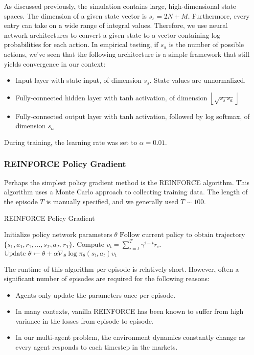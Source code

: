 \documentclass[twoside,twocolumn]{article}
\begin{document}
As discussed previously, the simulation contains large, high-dimensional state spaces. The dimension of a given state vector is $s_s = 2 N + M$. Furthermore, every entry can take on a wide range of integral values. Therefore, we use neural network architectures to convert a given state to a vector containing log probabilities for each action. In empirical testing, if $s_a$ is the number of possible actions, we've seen that the following architecture is a simple framework that still yields convergence in our context:
\begin{itemize}
  \item Input layer with state input, of dimension $s_s$. State values are unnormalized.
  \item Fully-connected hidden layer with tanh activation, of dimension $\left\lfloor \sqrt{s_s \, s_a} \right\rfloor$
  \item Fully-connected output layer with tanh activation, followed by log softmax, of dimension $s_a$
\end{itemize}
During training, the learning rate was set to $\alpha = 0.01$. 


\subsubsection{REINFORCE Policy Gradient}
Perhaps the simplest policy gradient method is the REINFORCE algorithm. This algorithm uses a Monte Carlo approach to collecting training data. The length of the episode $T$ is manually specified, and we generally used $T \sim 100$.
\begin{algorithm}
\caption{REINFORCE Policy Gradient \cite{reinforce-lectures}}\label{euclid}
\begin{algorithmic}[1]
\State $\text{Initialize policy network parameters }\theta$
\State $\text{Follow current policy to obtain trajectory }$\newline\phantom{======}$\{s_1, a_1, r_1, \ldots, s_T, a_T, r_T\}$.
\State $\text{Compute }v_t = \sum_{i = t}^T \gamma^{i- t} r_i$.
\State $\text{Update } \theta \leftarrow \theta + \alpha \nabla_{\theta}\log\pi_{\theta} (s_t, a_t) v_t$
\EndFor
\EndFor
\State \Return {$\theta$}
\EndProcedure
\end{algorithmic}
\end{algorithm}
The runtime of this algorithm per episode is relatively short. However, often a significant number of episodes are required for the following reasons:
\begin{itemize}
  \item Agents only update the parameters once per episode.
  \item In many contexts, vanilla REINFORCE has been known to suffer from high variance in the losses from episode to episode.\cite{reinforce-lectures}
  \item In our multi-agent problem, the environment dynamics constantly change as every agent responds to each timestep in the markets.
\end{itemize}
\end{document}
